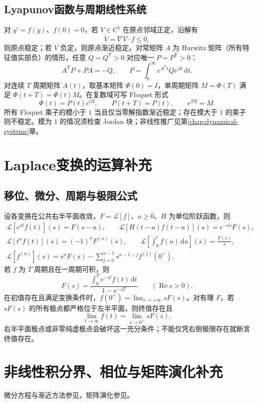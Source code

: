 \documentclass[../main.tex]{subfiles}
\begin{document}
\subsection{Lyapunov函数与周期线性系统}
对 $y'=f(y)$、$f(0)=0$，若 $V\in C^1$ 在原点邻域正定，沿解有
\[
\dot V=\nabla V\cdot f\le0,
\]
则原点稳定；若 $\dot V$ 负定，则原点渐近稳定。对常矩阵 $A$ 为 Hurwitz 矩阵（所有特征值实部负）的情形，任意 $Q=Q^{\mathsf T}>0$ 对应唯一 $P=P^{\mathsf T}>0$：
\[
A^{\mathsf T}P+PA=-Q,\qquad
P=\int_0^\infty e^{A^{\mathsf T}t}Qe^{At}\,\mathrm dt.
\]
对连续 $T$ 周期矩阵 $A(t)$，取基本矩阵 $\Phi(0)=I$，单周期矩阵 $M=\Phi(T)$ 满足 $\Phi(t+T)=\Phi(t)M$。在复数域可写 Floquet 形式
\[
\Phi(t)=P(t)e^{tB},\qquad P(t+T)=P(t),\qquad e^{TB}=M.
\]
所有 Floquet 乘子的模小于 $1$ 当且仅当零解指数渐近稳定；存在模大于 $1$ 的乘子则不稳定。模为 $1$ 的情况须检查 Jordan 块；非线性推广见第\ref{chap:dynamical-systems}章。

\section{Laplace变换的运算补充}
\subsection{移位、微分、周期与极限公式}
设各变换在公共右半平面收敛，$F=\mathcal L[f]$、$a\ge0$、$H$ 为单位阶跃函数，则
\begin{gather*}
\mathcal L[e^{at}f(t)](s)=F(s-a),\qquad
\mathcal L[H(t-a)f(t-a)](s)=e^{-as}F(s),\\
\mathcal L[t^nf(t)](s)=(-1)^nF^{(n)}(s),\qquad
\mathcal L\!\left[\int_0^t f(u)\,\mathrm du\right](s)=\frac{F(s)}s,\\
\mathcal L[f^{(n)}](s)=s^nF(s)-\sum_{j=0}^{n-1}s^{n-1-j}f^{(j)}(0^+).
\end{gather*}
若 $f$ 为 $T$ 周期且在一周期可积，则
\[
F(s)=\frac{\int_0^Te^{-st}f(t)\,\mathrm dt}{1-e^{-sT}}\qquad(\operatorname{Re}s>0).
\]
在初值存在且满足变换条件时，$f(0^+)=\lim_{s\to+\infty}sF(s)$。对有理 $F$，若 $sF(s)$ 的所有极点都严格位于左半平面，则终值存在且
\[
\lim_{t\to\infty}f(t)=\lim_{s\to0^+}sF(s).
\]
右半平面极点或非零纯虚极点会破坏这一充分条件；不能仅凭右侧极限存在就断言终值存在。
\section{非线性积分界、相位与矩阵演化补充}
微分方程与渐近方法参见\cite{teschl,dlmf}，矩阵演化参见\cite{geometric}。
\end{document}
